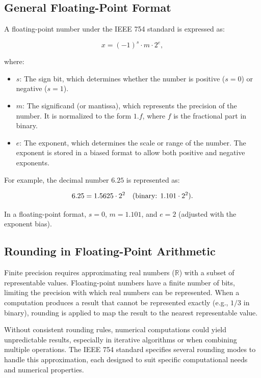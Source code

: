 \subsection{General Floating-Point Format}
A floating-point number under the IEEE 754 standard \cite{ieee2008} is expressed as:

\[
x = (-1)^s \cdot m \cdot 2^e,
\]

where:
\begin{itemize}[noitemsep]
    \item \( s \): The sign bit, which determines whether the number is positive (\( s = 0 \)) or negative (\( s = 1 \)).
    \item \( m \): The significand (or mantissa), which represents the precision of the number. It is normalized to the form \( 1.f \), where \( f \) is the fractional part in binary.
    \item \( e \): The exponent, which determines the scale or range of the number. The exponent is stored in a biased format to allow both positive and negative exponents.
\end{itemize}

For example, the decimal number \( 6.25 \) is represented as:

\[
6.25 = 1.5625 \cdot 2^2 \quad \text{(binary: \( 1.101 \cdot 2^2 \))}.
\]

In a floating-point format, \( s = 0 \), \( m = 1.101 \), and \( e = 2 \) (adjusted with the exponent bias).

\subsection{Rounding in Floating-Point Arithmetic}
Finite precision requires approximating real numbers (\( \mathbb{R} \)) with a subset of representable values. Floating-point numbers have a finite number of bits, limiting the precision with which real numbers can be represented. When a computation produces a result that cannot be represented exactly (e.g., \( 1/3 \) in binary), rounding is applied to map the result to the nearest representable value.

Without consistent rounding rules, numerical computations could yield unpredictable results, especially in iterative algorithms or when combining multiple operations. The IEEE 754 standard specifies several rounding modes to handle this approximation, each designed to suit specific computational needs and numerical properties.

